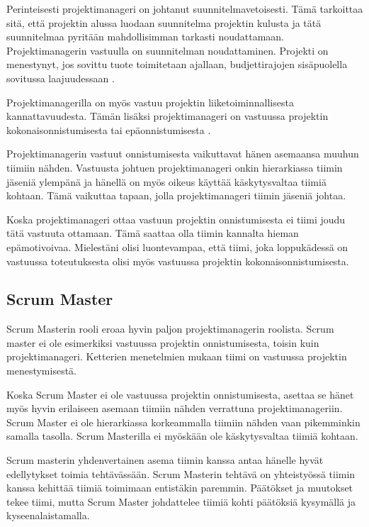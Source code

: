 \documentclass[a4paper]{article}
\begin{document}
Perinteisesti projektimanageri on johtanut suunnitelmavetoisesti. Tämä tarkoittaa sitä, että projektin alussa luodaan suunnitelma projektin kulusta ja tätä suunnitelmaa pyritään mahdollisimman tarkasti noudattamaan. Projektimanagerin vastuulla on suunnitelman noudattaminen. Projekti on menestynyt, jos sovittu tuote toimitetaan ajallaan, budjettirajojen sisäpuolella sovitussa laajuudessaan \citep{adkins2010}.

Projektimanagerilla on myös vastuu projektin liiketoiminnallisesta kannattavuudesta. Tämän lisäksi projektimanageri on vastuussa projektin kokonaisonnistumisesta tai epäonnistumisesta \citep{augustine2005}.

Projektimanagerin vastuut onnistumisesta vaikuttavat hänen asemaansa muuhun tiimiin nähden. Vastuusta johtuen projektimanageri onkin hierarkiassa tiimin jäseniä ylempänä ja hänellä on myös oikeus käyttää käskytysvaltaa tiimiä kohtaan. Tämä vaikuttaa tapaan, jolla projektimanageri tiimin jäseniä johtaa.

Koska projektimanageri ottaa vastuun projektin onnistumisesta ei tiimi joudu tätä vastuuta ottamaan. Tämä saattaa olla tiimin kannalta hieman epämotivoivaa. Mielestäni olisi luontevampaa, että tiimi, joka loppukädessä on vastuussa toteutuksesta olisi myös vastuussa projektin kokonaisonnistumisesta.

\subsection{Scrum Master}

Scrum Masterin rooli eroaa hyvin paljon projektimanagerin roolista. Scrum master ei ole esimerkiksi vastuussa projektin onnistumisesta, toisin kuin projektimanageri. Ketterien menetelmien mukaan tiimi on vastuussa projektin menestymisestä.

Koska Scrum Master ei ole vastuussa projektin onnistumisesta, asettaa se hänet myös hyvin erilaiseen asemaan tiimiin nähden verrattuna projektimanageriin. Scrum Master ei ole hierarkiassa korkeammalla tiimiin nähden vaan pikemminkin samalla tasolla. Scrum Masterilla ei myöskään ole käskytysvaltaa tiimiä kohtaan.

Scrum masterin yhdenvertainen asema tiimin kanssa antaa hänelle hyvät edellytykset toimia tehtävässään. Scrum Masterin tehtävä on yhteistyössä tiimin kanssa kehittää tiimiä toimimaan entistäkin paremmin. Päätökset ja muutokset tekee tiimi, mutta Scrum Master johdattelee tiimiä kohti päätöksiä kysymällä ja kyseenalaistamalla.
\end{document}
